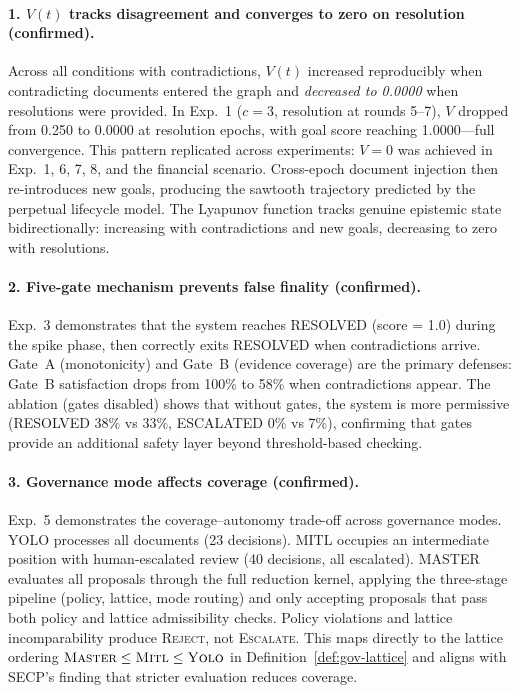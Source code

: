 \documentclass[11pt]{article}
\begin{document}
\paragraph{1. $V(t)$ tracks disagreement and converges to zero on resolution (confirmed).} Across all conditions with contradictions, $V(t)$ increased reproducibly when contradicting documents entered the graph and \emph{decreased to 0.0000} when resolutions were provided. In Exp.~1 ($c = 3$, resolution at rounds 5--7), $V$ dropped from 0.250 to 0.0000 at resolution epochs, with goal score reaching 1.0000---full convergence. This pattern replicated across experiments: $V = 0$ was achieved in Exp.~1, 6, 7, 8, and the financial scenario. Cross-epoch document injection then re-introduces new goals, producing the sawtooth trajectory predicted by the perpetual lifecycle model. The Lyapunov function tracks genuine epistemic state bidirectionally: increasing with contradictions and new goals, decreasing to zero with resolutions.

\paragraph{2. Five-gate mechanism prevents false finality (confirmed).} Exp.~3 demonstrates that the system reaches RESOLVED (score = 1.0) during the spike phase, then correctly exits RESOLVED when contradictions arrive. Gate~A (monotonicity) and Gate~B (evidence coverage) are the primary defenses: Gate~B satisfaction drops from 100\% to 58\% when contradictions appear. The ablation (gates disabled) shows that without gates, the system is more permissive (RESOLVED 38\% vs 33\%, ESCALATED 0\% vs 7\%), confirming that gates provide an additional safety layer beyond threshold-based checking.

\paragraph{3. Governance mode affects coverage (confirmed).} Exp.~5 demonstrates the coverage--autonomy trade-off across governance modes. YOLO processes all documents (23 decisions). MITL occupies an intermediate position with human-escalated review (40 decisions, all escalated). MASTER evaluates all proposals through the full reduction kernel, applying the three-stage pipeline (policy, lattice, mode routing) and only accepting proposals that pass both policy and lattice admissibility checks. Policy violations and lattice incomparability produce \textsc{Reject}, not \textsc{Escalate}. This maps directly to the lattice ordering $\textsc{Master} \leq \textsc{Mitl} \leq \textsc{Yolo}$ in Definition~\ref{def:gov-lattice} and aligns with SECP's finding that stricter evaluation reduces coverage.
\end{document}
